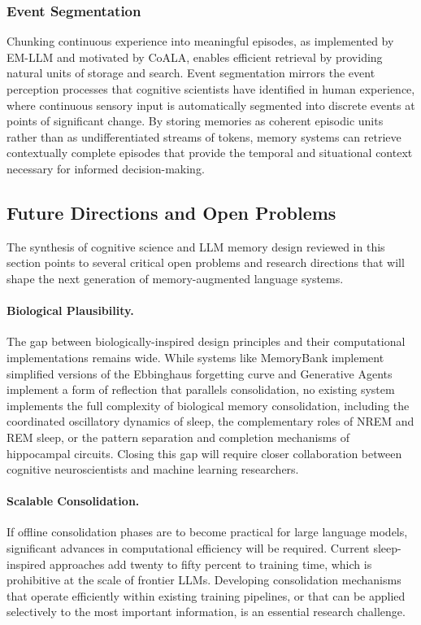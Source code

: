 \subsubsection{Event Segmentation}

Chunking continuous experience into meaningful episodes, as implemented by EM-LLM and motivated by CoALA, enables efficient retrieval by providing natural units of storage and search. Event segmentation mirrors the event perception processes that cognitive scientists have identified in human experience, where continuous sensory input is automatically segmented into discrete events at points of significant change. By storing memories as coherent episodic units rather than as undifferentiated streams of tokens, memory systems can retrieve contextually complete episodes that provide the temporal and situational context necessary for informed decision-making.

\subsection{Future Directions and Open Problems}

The synthesis of cognitive science and LLM memory design reviewed in this section points to several critical open problems and research directions that will shape the next generation of memory-augmented language systems.

\paragraph{Biological Plausibility.} The gap between biologically-inspired design principles and their computational implementations remains wide. While systems like MemoryBank implement simplified versions of the Ebbinghaus forgetting curve and Generative Agents implement a form of reflection that parallels consolidation, no existing system implements the full complexity of biological memory consolidation, including the coordinated oscillatory dynamics of sleep, the complementary roles of NREM and REM sleep, or the pattern separation and completion mechanisms of hippocampal circuits. Closing this gap will require closer collaboration between cognitive neuroscientists and machine learning researchers.

\paragraph{Scalable Consolidation.} If offline consolidation phases are to become practical for large language models, significant advances in computational efficiency will be required. Current sleep-inspired approaches add twenty to fifty percent to training time, which is prohibitive at the scale of frontier LLMs. Developing consolidation mechanisms that operate efficiently within existing training pipelines, or that can be applied selectively to the most important information, is an essential research challenge.


